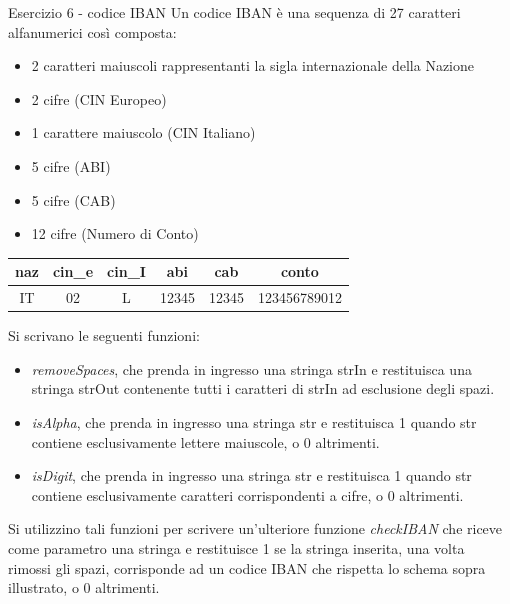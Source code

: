 \documentclass[handout]{beamer}
\begin{document}
\begin{frame}[allowframebreaks]{Esercizio 6 - codice IBAN}
Un codice IBAN è una sequenza di 27 caratteri alfanumerici così composta:
\begin{itemize}
\item 2 caratteri maiuscoli rappresentanti la sigla internazionale della Nazione
\item 2 cifre (CIN Europeo)
\item 1 carattere maiuscolo (CIN Italiano)
\item 5 cifre (ABI)
\item 5 cifre (CAB)
\item 12 cifre (Numero di Conto)
\end{itemize}
\begin{tabular}{|c|c|c|c|c|c|}
	\hline
	naz & cin\_e & cin\_I & abi & cab	&	conto \\
	\hline
	IT&02&L&12345&12345&123456789012\\
	\hline
\end{tabular}


Si scrivano le seguenti funzioni:
\begin{itemize}
\item \emph{removeSpaces}, che prenda in ingresso una stringa strIn e restituisca una stringa strOut contenente tutti i caratteri di strIn ad esclusione degli spazi.
\item \emph{isAlpha}, che prenda in ingresso una stringa str e restituisca 1 quando str contiene esclusivamente lettere maiuscole, o 0 altrimenti.
\item \emph{isDigit}, che prenda in ingresso una stringa str e restituisca 1 quando str contiene esclusivamente caratteri corrispondenti a cifre, o 0 altrimenti.
\end{itemize}

Si utilizzino tali funzioni per scrivere un’ulteriore funzione \emph{checkIBAN} che riceve come parametro una stringa e restituisce 1 se la stringa inserita, una volta rimossi gli spazi, corrisponde ad un codice IBAN che rispetta lo schema sopra illustrato, o 0 altrimenti.
\end{frame}
\end{document}
